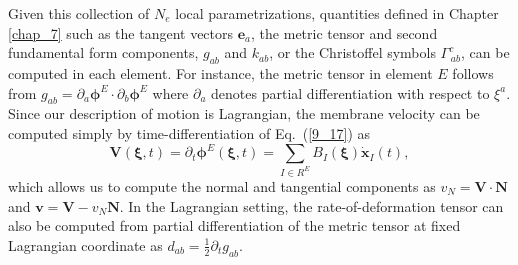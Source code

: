 Given this collection of $N_e$ local parametrizations,  quantities defined in Chapter \ref{chap_7} such as the tangent vectors $\bm{e}_a$, the metric tensor and second fundamental form components, $g_{ab}$ and $k_{ab}$, or the Christoffel symbols $\Gamma^c_{\,ab}$, can be computed in each element. For instance, the metric tensor in element $E$ follows from $g_{ab} = \partial_a \bm{\phi}^E \cdot  \partial_b \bm{\phi}^E$ where $\partial_a$ denotes partial differentiation with respect to $\xi^a$. Since our description of motion is Lagrangian, the membrane velocity can be computed simply by time-differentiation of Eq.~(\ref{9_17}) as 
\begin{equation} 
    \bm{V}(\bm{\xi},t)= \partial_t\bm{\phi}^E(\bm{\xi},t)= \underset{I \in R^E}{\mathrm{\sum}} B_I(\bm{\xi})\dot{\bm{x}}_I(t),
\end{equation} 
which allows us to compute the normal and tangential components as $v_N = \bm{V} \cdot \bm{N}$ and $\bm{v} = \bm{V} - v_N \bm{N}$. In the Lagrangian setting, the rate-of-deformation tensor can also be computed from partial differentiation of the metric tensor at fixed Lagrangian coordinate as $d_{ab} = \frac{1}{2}\partial_t g_{ab}$.





